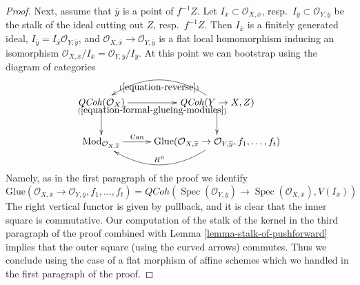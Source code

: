 \documentclass[10pt,a4paper]{amsart}
\theoremstyle{plain}
\theoremstyle{definition}
\theoremstyle{remark}
\numberwithin{equation}{subsection}
\def\Spec{\mathop{\mathrm{Spec}}}
\def\QCoh{\mathit{QCoh}}
\begin{document}
\begin{proof}
\medskip\noindent
Next, assume that $\overline{y}$ is a point of $f^{-1}Z$.
Let $I_{\overline{x}} \subset \mathcal{O}_{X, \overline{x}}$,
resp.\ $I_{\overline{y}} \subset \mathcal{O}_{Y, \overline{y}}$
be the stalk of the ideal cutting out $Z$, resp.\ $f^{-1}Z$.
Then $I_{\overline{x}}$ is a finitely generated ideal,
$I_{\overline{y}} = I_{\overline{x}}\mathcal{O}_{Y, \overline{y}}$,
and $\mathcal{O}_{X, \overline{x}} \to \mathcal{O}_{Y, \overline{y}}$
is a flat local homomorphism inducing an isomorphism
$\mathcal{O}_{X, \overline{x}}/I_{\overline{x}} =
\mathcal{O}_{Y, \overline{y}}/I_{\overline{y}}$.
At this point we can bootstrap using the diagram of categories
$$
\xymatrix{
\QCoh(\mathcal{O}_X) \ar[r]_-{(\ref{equation-formal-glueing-modules})} \ar[d] &
\QCoh(Y \to X, Z) \ar[d] \ar@/_2pc/[l]^{(\ref{equation-reverse})} \\
\text{Mod}_{\mathcal{O}_{X, \overline{x}}} \ar[r]^-{\text{Can}} &
\text{Glue}(\mathcal{O}_{X, \overline{x}} \to \mathcal{O}_{Y, \overline{y}},
f_1, \ldots, f_t) \ar@/^2pc/[l]_{H^0}
}
$$
Namely, as in the first paragraph of the proof we identify
$$
\text{Glue}(\mathcal{O}_{X, \overline{x}} \to \mathcal{O}_{Y, \overline{y}},
f_1, \ldots, f_t)
=
\QCoh(\Spec(\mathcal{O}_{Y, \overline{y}}) \to
\Spec(\mathcal{O}_{X, \overline{x}}), V(I_{\overline{x}}))
$$
The right vertical functor is given by pullback, and it is clear that
the inner square is commutative. Our computation of the stalk of the
kernel in the third paragraph of the proof combined with
Lemma \ref{lemma-stalk-of-pushforward} implies that
the outer square (using the curved arrows) commutes. Thus we
conclude using the case of a flat morphism of affine schemes
which we handled in the first paragraph of the proof.
\end{proof}
\end{document}
